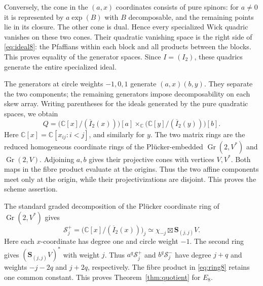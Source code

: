 \documentclass[11pt]{article}
\newcommand{\C}{\mathbb C}
\newcommand{\Gr}{\operatorname{Gr}}
\newcommand{\bS}{\mathbf S}
\theoremstyle{definition}
\numberwithin{equation}{section}
\begin{document}
Conversely, the cone in the $(a,x)$ coordinates consists of pure
spinors: for $a\ne0$ it is represented by $a\exp(B)$ with $B$
decomposable, and the remaining points lie in its closure.
The other cone is dual. Hence every specialized Wick quadric vanishes
on these two cones. Their quadratic vanishing space is the right side
of \eqref{eq:ideal8}: the Pfaffians within each block and all products
between the blocks. This proves equality of the generator spaces.
Since $I=(I_2)$, these quadrics generate the entire specialized ideal.

The generators at circle weights $-1,0,1$ generate $(a,x)(b,y)$.
They separate the two components; the remaining generators impose
decomposability on each skew array. Writing parentheses for the ideals
generated by the pure quadratic spaces, we obtain
\begin{equation}\label{eq:ring8}
 Q=\bigl(\C[x]/(\overline I_2(x))\bigr)[a]\times_\C
       \bigl(\C[y]/(\overline I_2(y))\bigr)[b].
\end{equation}
Here $\C[x]=\C[x_{ij}:i<j]$, and similarly for $y$.
The two matrix rings are the reduced homogeneous coordinate rings
of the Pl\"ucker-embedded $\Gr(2,V^*)$ and $\Gr(2,V)$.
Adjoining $a,b$ gives their projective cones with vertices $V,V^*$.
Both maps in the fibre product evaluate at the origins. Thus the two
affine components meet only at the origin, while their projectivizations
are disjoint. This proves the scheme assertion.

The standard graded decomposition of the Pl\"ucker coordinate ring
of $\Gr(2,V^*)$ gives
\[
 \mathcal S_j^+=\bigl(\C[x]/(\overline I_2(x))\bigr)_j
       \simeq\chi_{-j}\boxtimes\bS_{(j,j)}V.
\]
Here each $x$-coordinate has degree one and circle weight $-1$.
The second ring gives $(\bS_{(j,j)}V)^*$ with weight $j$.
Thus $a^q\mathcal S_j^+$ and $b^q\mathcal S_j^-$ have degree
$j+q$ and weights $-j-2q$ and $j+2q$, respectively.
The fibre product in \eqref{eq:ring8} retains one common constant.
This proves Theorem~\ref{thm:quotient} for $E_8$.
\end{document}
